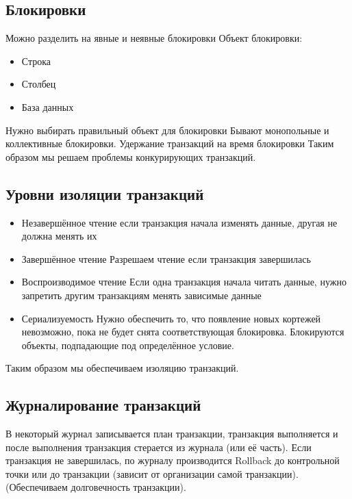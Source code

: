 \documentclass{article}
\begin{document}
\newpage

\subsection{Блокировки}
Можно разделить на явные и неявные блокировки 
\newline Объект блокировки:
\begin{itemize}
    \item Строка
    \item Столбец
    \item База данных
\end{itemize}
Нужно выбирать правильный объект для блокировки
\newline Бывают монопольные и коллективные блокировки.
\newline Удержание транзакций на время блокировки
\newline Таким образом мы решаем проблемы конкурирующих транзакций. 

\subsection{Уровни изоляции транзакций}
\begin{itemize}
    \item Незавершённое чтение
    \newline если транзакция начала изменять данные, другая не должна менять их
    \item Завершённое чтение
    \newline Разрешаем чтение если транзакция завершилась
    \item Воспроизводимое чтение 
    \newline Если одна транзакция начала читать данные, нужно запретить другим транзакциям менять зависимые данные
    \item Сериализуемость
    \newline Нужно обеспечить то, что появление новых кортежей невозможно, пока не будет снята соответствующая блокировка.
    \newline Блокируются объекты, подпадающие под определённое условие.
\end{itemize}
Таким образом мы обеспечиваем изоляцию транзакций.

\subsection{Журналирование транзакций}
В некоторый журнал записывается план транзакции, транзакция выполняется и после выполнения транзакция стерается из журнала (или её часть). 
\newline Если транзакция не завершилась, по журналу производится Rollback до контрольной точки или до транзакции (зависит от организации самой транзакции).
\newline (Обеспечиваем долговечность транзакции).
\end{document}
